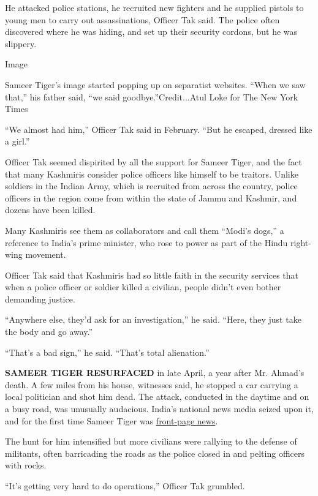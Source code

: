 He attacked police stations, he recruited new fighters and he supplied
pistols to young men to carry out assassinations, Officer Tak said. The
police often discovered where he was hiding, and set up their security
cordons, but he was slippery.

Image

Sameer Tiger's image started popping up on separatist websites. ``When
we saw that,'' his father said, ``we said goodbye.''Credit...Atul Loke
for The New York Times

``We almost had him,'' Officer Tak said in February. ``But he escaped,
dressed like a girl.''

Officer Tak seemed dispirited by all the support for Sameer Tiger, and
the fact that many Kashmiris consider police officers like himself to be
traitors. Unlike soldiers in the Indian Army, which is recruited from
across the country, police officers in the region come from within the
state of Jammu and Kashmir, and dozens have been killed.

Many Kashmiris see them as collaborators and call them ``Modi's dogs,''
a reference to India's prime minister, who rose to power as part of the
Hindu right-wing movement.

Officer Tak said that Kashmiris had so little faith in the security
services that when a police officer or soldier killed a civilian, people
didn't even bother demanding justice.

``Anywhere else, they'd ask for an investigation,'' he said. ``Here,
they just take the body and go away.''

``That's a bad sign,'' he said. ``That's total alienation.''

\textbf{SAMEER TIGER RESURFACED} in late April, a year after Mr. Ahmad's
death. A few miles from his house, witnesses said, he stopped a car
carrying a local politician and shot him dead. The attack, conducted in
the daytime and on a busy road, was unusually audacious. India's
national news media seized upon it, and for the first time Sameer Tiger
was
\href{https://www.news18.com/news/india/ghulam-nabi-patel-slain-by-hizbul-mujahideen-disowned-by-pdp-congress-1729811.html}{front-page
news}.

The hunt for him intensified but more civilians were rallying to the
defense of militants, often barricading the roads as the police closed
in and pelting officers with rocks.

``It's getting very hard to do operations,'' Officer Tak grumbled.

